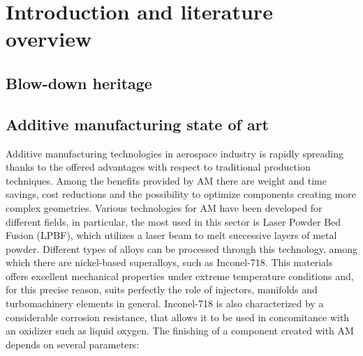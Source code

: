 \section{Introduction and literature overview}
\label{sec:introduction}

\subsection{Blow-down heritage}
\label{subsec:blowdown_intro}

\subsection{Additive manufacturing state of art}
\label{subsec:additive_intro}

Additive manufacturing technologies in aerospace industry is rapidly spreading thanks to the offered advantages with respect to traditional production techniques. Among the benefits provided by AM there are weight and time savings, cost reductions and  the possibility to optimize components creating more complex geometries\cite{materials_and_desing}.
Various technologies for AM have been developed for different fields, in particular, the most used in this sector is Laser Powder Bed Fusion (LPBF), which utilizes a laser beam to melt successive layers of metal powder. Different types of alloys can be processed through this technology, among which there are nickel-based superalloys, such as Inconel-718. This materials offers excellent mechanical properties under extreme temperature conditions and, for this precise reason, suits perfectly the role of injectors, manifolds and turbomachinery elements in general. Inconel-718 is also characterized by a considerable corrosion resistance, that allows it to be used in concomitance with an oxidizer such as liquid oxygen\cite{Inconel_vs_steel}. The finishing of a component created with AM depends on several parameters: 
